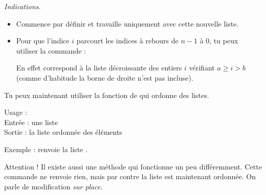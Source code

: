\documentclass[11pt,class=report,crop=false]{standalone}
\begin{document}
\begin{activite}
\medskip

\emph{Indications.}
\begin{itemize}
  \item Commence par définir  et travaille uniquement avec cette nouvelle liste.
  \item Pour que l'indice $i$ parcourt les indices à rebours de $n-1$ à $0$, tu peux utiliser la commande :\\
\centerline{}
En effet  correspond à la liste décroissante des entiers $i$ vérifiant $a \ge i > b$ (comme d'habitude la borne de droite n'est pas incluse).
\end{itemize}

\end{activite}


\begin{cours}[Tri]

Tu peux maintenant utiliser la fonction  de \Python{} qui ordonne des listes.

 
  \begin{fonctionpython}
    Usage : \\
    Entrée : une liste  \\
    Sortie : la liste ordonnée des éléments
  
  \medskip
     
   Exemple :  renvoie la liste \ci{[4,6,6,7,8,11,12,13]}.

  \end{fonctionpython}  
  
  Attention ! Il existe aussi une méthode  qui fonctionne un peu différemment. Cette commande ne renvoie rien, mais par contre la liste  est maintenant ordonnée. On parle de modification \emph{sur place}.
\end{cours}


\end{document}

